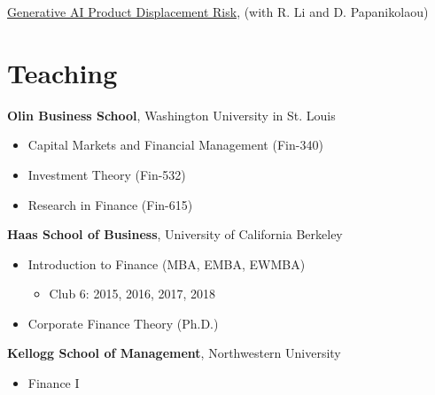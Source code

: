 \documentclass[margin,line,11pt]{resume}
\begin{document}
\begin{resume}
  \href{https://papers.ssrn.com/sol3/papers.cfm?abstract_id=6368558}{Generative AI Product Displacement Risk}, (with R. Li and D. Papanikolaou)


















    \section{\mysidestyle Teaching}
{\bf Olin Business School}, Washington University in St. Louis \vspace{1mm}
    \begin{itemize}
        \item Capital Markets and Financial Management (Fin-340)
        \item Investment Theory (Fin-532)
        \item Research in Finance (Fin-615)
    \end{itemize}


    {\bf Haas School of Business}, University of California Berkeley \vspace{1mm}
    \begin{itemize}

    \item Introduction to Finance (MBA, EMBA, EWMBA)
    \begin{itemize}
        \item Club 6: 2015, 2016, 2017, 2018
    \end{itemize}
    \item Corporate Finance Theory (Ph.D.)
    \end{itemize}
    {\bf Kellogg School of Management}, Northwestern University \vspace{1mm}
    \begin{itemize}
    \item Finance I
    \end{itemize}


\end{resume}
\end{document}
